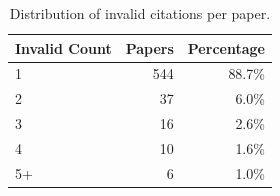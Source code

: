 \begin{table}[t]
  \centering
  \begin{threeparttable}
    \caption{Distribution of invalid citations per paper.}
    \label{tab:invalid_per_paper}
    \small
\begin{tabular}{lrr}
\toprule
\textbf{Invalid Count} & \textbf{Papers} & \textbf{Percentage} \\
\midrule
\cellcolor{red!10}1 & \cellcolor{red!10}544 & \cellcolor{red!10}88.7\% \\
\cellcolor{red!20}2 & \cellcolor{red!20}37 & \cellcolor{red!20}6.0\% \\
\cellcolor{red!30}3 & \cellcolor{red!30}16 & \cellcolor{red!30}2.6\% \\
\cellcolor{red!40}4 & \cellcolor{red!40}10 & \cellcolor{red!40}1.6\% \\
\cellcolor{red!50}5+ & \cellcolor{red!50}6 & \cellcolor{red!50}1.0\% \\
\bottomrule
\end{tabular}
  \end{threeparttable}
\end{table}

